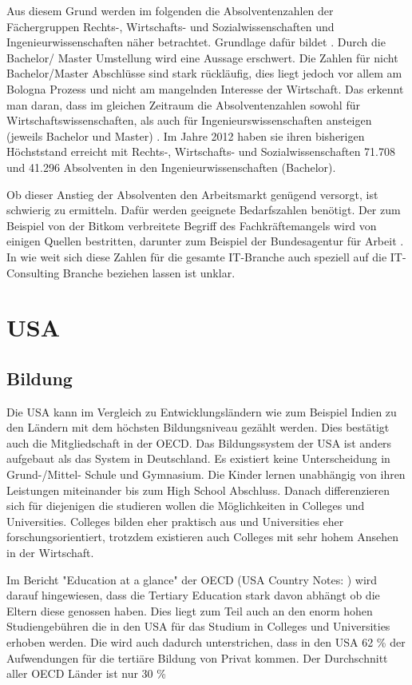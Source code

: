 Aus diesem Grund werden im folgenden die Absolventenzahlen der Fächergruppen Rechts-, Wirtschafts- und Sozialwissenschaften und Ingenieurwissenschaften näher betrachtet.
Grundlage dafür bildet \cite{absolventen} . Durch die Bachelor/ Master Umstellung wird eine Aussage erschwert. Die Zahlen für nicht Bachelor/Master Abschlüsse sind stark rückläufig, dies liegt jedoch vor allem am Bologna Prozess und nicht am mangelnden Interesse der Wirtschaft. Das erkennt man daran, dass im gleichen Zeitraum die Absolventenzahlen sowohl für Wirtschaftswissenschaften, als auch für Ingenieurswissenschaften ansteigen (jeweils Bachelor und Master) . Im Jahre 2012 haben sie ihren bisherigen Höchststand erreicht mit Rechts-, Wirtschafts- und Sozialwissenschaften 71.708 und 41.296 Absolventen in den Ingenieurwissenschaften (Bachelor).

Ob dieser Anstieg der Absolventen den Arbeitsmarkt genügend versorgt, ist schwierig zu ermitteln. Dafür werden geeignete Bedarfszahlen benötigt. Der zum Beispiel von der Bitkom verbreitete Begriff \cite{fachkraft} des Fachkräftemangels wird von einigen Quellen bestritten, darunter zum Beispiel der Bundesagentur für Arbeit \cite{fachkraftnein}. In wie weit sich diese Zahlen für die gesamte IT-Branche auch speziell auf die IT-Consulting Branche beziehen lassen ist unklar.

\section{USA}
\subsection{Bildung}
Die USA kann im Vergleich zu Entwicklungsländern wie zum Beispiel Indien zu den Ländern mit dem höchsten Bildungsniveau gezählt werden. Dies bestätigt auch die Mitgliedschaft in der OECD. Das Bildungssystem der USA ist anders aufgebaut als das System in Deutschland. Es existiert keine Unterscheidung in Grund-/Mittel- Schule und Gymnasium. Die Kinder lernen unabhängig von ihren Leistungen miteinander bis zum High School Abschluss. Danach differenzieren sich für diejenigen die studieren wollen die Möglichkeiten in Colleges und Universities. Colleges bilden eher praktisch aus und Universities eher forschungsorientiert, trotzdem existieren auch Colleges mit sehr hohem Ansehen in der Wirtschaft. 

Im Bericht "Education at a glance" der OECD (USA Country Notes: \cite{oecd4}) wird darauf hingewiesen, dass die Tertiary Education stark davon abhängt ob die Eltern diese genossen haben. Dies liegt zum Teil auch an den enorm hohen Studiengebühren die in den USA für das Studium in Colleges und Universities erhoben werden. Die wird auch dadurch unterstrichen, dass in den USA 62 \% der Aufwendungen für die tertiäre Bildung von Privat kommen. Der Durchschnitt aller OECD Länder ist nur 30 \%

